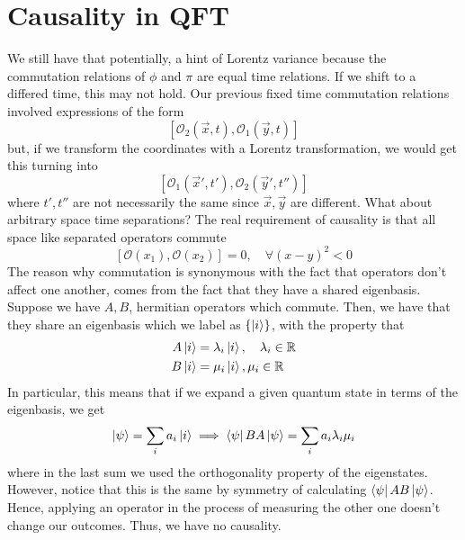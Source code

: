 \documentclass[11pt, oneside]{article}   	%
\theoremstyle{newline}
\theoremstyle{newline}
\theoremstyle{newline}
\theoremstyle{newline}
\theoremstyle{newline}
\begin{document}
\section{Causality in QFT} 
We still have that potentially, a hint of Lorentz variance because 
the commutation relations of $ \phi$ and $\pi $ are 
equal time relations. If we shift to a differed time, this
may not hold. Our previous fixed time commutation relations involved expressions of the form 
\[
[ \mathcal{ O}_2( \vec{x}, t ) , \mathcal{O}_1 ( \vec{y}, t ) ]
\] but, if we transform the coordinates with a Lorentz transformation, we would get this turning into
\[
[ \mathcal{ O }_1 ( \vec{x}' , t' ) , \mathcal{ O }_2 ( \vec{y}', t'' ) ]  
\] where $ t' ,  t'' $ are not necessarily the same since $ \vec{x}, \vec{y}$ are different. 
What about arbitrary space time separations? 
The real requirement of causality is that all 
space like separated operators commute 
\[ 	[ \mathcal{ O }( x_1 ) , \mathcal{ O }( x_2) ] = 0 , \quad \forall ( x- y)^2 < 0 
\] The reason why commutation is synonymous 
with the fact that operators don't affect one another, 
comes from the fact that they have a shared eigenbasis. 
Suppose we have $A, B  $, hermitian operators which commute. 
Then, we have that they share an eigenbasis which we label as $ \left\{  \ket{ i }  \right\} $, with the property that 
\begin{align*}
A \ket{ i }  & = \lambda_i \ket{ i }, \quad \lambda_i \in \mathbb { R} \\
B \ket{i } &=  \mu_i \ket{ i }, \mu_i \in \mathbb{ R}  
\end{align*} In particular, this means that 
if we expand a given quantum state in terms of the eigenbasis, we get 
\[
\ket{ \psi }  = \sum_{ i } a_{ i } \ket{ i } \implies \bra{ \psi }BA\ket{\psi}  = \sum_i a_{ i } \lambda_{ i } \mu_{ i}
\] where in the last sum we used the orthogonality property 
of the eigenstates. However, notice that this is the same by symmetry of 
calculating $ \bra{ \psi }AB\ket{ \psi}$. Hence, applying an operator 
in the process of measuring the other one doesn't change our 
outcomes. Thus, we have no causality.
\end{document}
